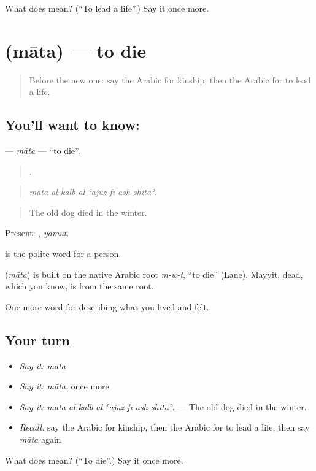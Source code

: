 \begin{tcolorbox}[breakable,colback=teal!4,colframe=teal!35!black,title={Before you move on}]
What does  mean? (\textquotedblleft{}To lead a life\textquotedblright{}.) Say it once more.
\end{tcolorbox}
\section[\texorpdfstring{\ar{مات} (māta)}{مات (māta)}]{ (māta) — to die}

\label{lesson:AR-C532-mata}



\begin{quote}
Before the new one: say the Arabic for kinship, then the Arabic for to lead a life.
\end{quote}

\subsection*{You'll want to know: }
\textbf{} — \emph{māta} — \textquotedblleft{}to die\textquotedblright{}.

\begin{quote}
    .
\end{quote}

\begin{quote}
\emph{māta al-kalb al-ʿajūz fī ash-shitāʾ.}
\end{quote}

\begin{quote}
The old dog died in the winter.
\end{quote}

Present: , \emph{yamūt}.

 is the polite word for a person.

\begin{cousinweb}
\textbf{} (\emph{māta}) is built on the native Arabic root \emph{m-w-t}, \textquotedblleft{}to die\textquotedblright{} (Lane). Mayyit, dead, which you know, is from the same root.
\end{cousinweb}

\begin{grammarlens}[title={What you've built}]
One more word for describing what you lived and felt.
\end{grammarlens}

\subsection*{Your turn}
\begin{itemize}
\raggedright
  \item \emph{Say it:} \emph{māta}
  \item \emph{Say it:} \emph{māta}, once more
  \item \emph{Say it:} \emph{māta al-kalb al-ʿajūz fī ash-shitāʾ.} — The old dog died in the winter.
  \item \emph{Recall:} say the Arabic for kinship, then the Arabic for to lead a life, then say \emph{māta} again
\end{itemize}

\begin{tcolorbox}[breakable,colback=teal!4,colframe=teal!35!black,title={Before you move on}]
What does  mean? (\textquotedblleft{}To die\textquotedblright{}.) Say it once more.
\end{tcolorbox}
